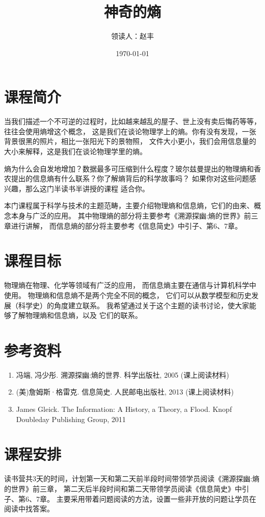 \documentclass[12pt]{ctexart}
\title{神奇的熵}
\author{领读人：赵丰}
\date\today
\begin{document}

\maketitle



\section{课程简介}
当我们描述一个不可逆的过程时，比如越来越乱的屋子、世上没有卖后悔药等等，往往会使用熵增这个概念，
这是我们在谈论物理学上的熵。你有没有发现，一张背景很黑的照片，相比一张阳光下的景物照，
文件大小更小，我们会用信息量的大小来解释，这是我们在谈论物理学里的熵。

熵为什么会自发地增加？数据最多可压缩到什么程度？玻尔兹曼提出的物理熵和香农提出的信息熵有什么联系？你了解熵背后的科学故事吗？
如果你对这些问题感兴趣，那么这门半读书半讲授的课程
适合你。

本门课程属于科学与技术的主题范畴，主要介绍物理熵和信息熵，它们的由来、概念本身与广泛的应用。
其中物理熵的部分将主要参考《溯源探幽:熵的世界》前三章进行讲解，
而信息熵的部分将主要参考《信息简史》中引子、第6、7章。


\section{课程目标}
物理熵在物理、化学等领域有广泛的应用，
而信息熵主要在通信与计算机科学中使用。
物理熵和信息熵不是两个完全不同的概念，
它们可以从数学模型和历史发展（科学史）的角度建立联系。
我希望通过关于这个主题的读书讨论，使大家能够了解物理熵和信息熵，以及
它们的联系。

\section{参考资料}
\begin{enumerate}
\item 冯端, 冯少彤. 溯源探幽:熵的世界. 科学出版社, 2005 (课上阅读材料)
\item (美)詹姆斯·格雷克. 信息简史. 人民邮电出版社, 2013 (课上阅读材料)
\item James Gleick. The Information: A History, a Theory, a Flood. Knopf Doubleday Publishing Group, 2011
\end{enumerate}

\section{课程安排}
读书营共3天的时间，计划第一天和第二天前半段时间带领学员阅读《溯源探幽:熵的世界》前三章，
第二天后半段时间和第二天带领学员阅读《信息简史》中引子、第6、7章。
主要采用带着问题阅读的方法，设置一些非开放的问题让学员在阅读中找答案。
\end{document}
